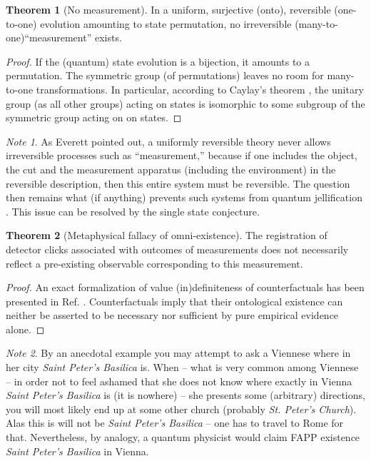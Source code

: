 \documentclass[%
  preprint,
 showpacs,
 showkeys,
 preprintnumbers,
 amsmath,amssymb,
 aps,
 prl,
  longbibliography,
 ]{revtex4-1}
\theoremstyle{definition}
\newtheorem{theorem}{Theorem}
\theoremstyle{remark}
\newtheorem*{note}{Note}
\begin{document}
\begin{theorem}[No measurement]
In a uniform, surjective (onto),  reversible (one-to-one)  evolution amounting to state permutation,
no irreversible (many-to-one)``measurement'' exists.
\end{theorem}
\begin{proof}
If the (quantum) state evolution is a bijection, it amounts to a permutation.
The symmetric group (of permutations) leaves no room for many-to-one transformations.
In particular, according to Caylay's theorem \cite{jacobson-LoAAI},
the unitary group (as all other groups) acting on states
is isomorphic to some subgroup of the symmetric group acting on on states.
\end{proof}
\begin{note}
As Everett \cite{everett}
pointed out, a uniformly reversible theory never allows irreversible processes such as ``measurement,''
because if one includes the object, the cut and the measurement apparatus (including the environment)
in the reversible description, then this entire system must be reversible.
The question then remains what (if anything) prevents such systems
from quantum jellification  \cite{schroedinger-interpretation}.
This issue can be resolved by the single state conjecture.
\end{note}




\begin{theorem}[Metaphysical fallacy of omni-existence]
The registration of detector clicks associated with outcomes of measurements
does not necessarily reflect a pre-existing observable corresponding to this measurement.
\end{theorem}
\begin{proof}
An exact formalization of value (in)definiteness
of counterfactuals
has been presented in Ref. \cite{2012-incomput-proofsCJ}.
Counterfactuals imply that their ontological
existence can neither be asserted to be necessary nor sufficient by pure empirical evidence alone.
\end{proof}
\begin{note}
By an anecdotal example you may attempt to ask a Viennese where in her city {\it Saint Peter's Basilica} is.
When
--
what is very common among Viennese --
in order not to feel ashamed that she does not know where exactly in Vienna {\it Saint Peter's Basilica} is
(it is nowhere)
--
she presents some (arbitrary) directions,
you will most likely end up at some other church (probably {\it St. Peter's Church}).
Alas this is will not be
{\it Saint Peter's Basilica}
-- one has to travel to Rome for that.
Nevertheless, by analogy, a quantum physicist would claim FAPP existence {\it Saint Peter's Basilica} in Vienna.
\end{note}
\end{document}
